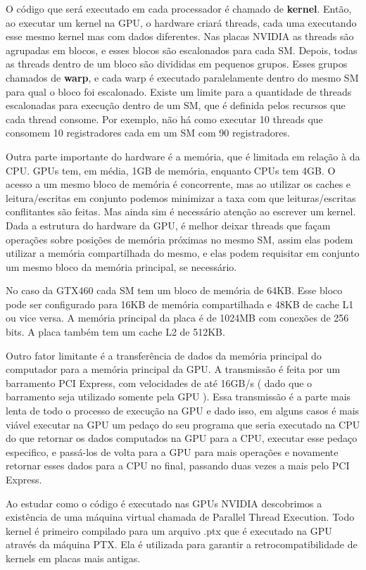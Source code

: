 O código que será executado em cada processador é chamado de \textbf{kernel}. Então, ao executar um kernel na GPU, o 
hardware criará threads, cada uma executando esse mesmo kernel mas com dados diferentes. Nas placas NVIDIA as threads 
são agrupadas em blocos, e esses blocos são escalonados para cada SM. Depois, todas as threads dentro de um bloco são 
divididas em pequenos grupos. Esses grupos chamados de \textbf{warp}\cite{paulo}, e cada warp é executado paralelamente dentro do 
mesmo SM para qual o bloco foi escalonado. Existe um limite para a quantidade de threads escalonadas para execução
dentro de um SM, que é definida pelos recursos que cada thread consome. Por exemplo, não há como executar 10 threads
que consomem 10 registradores cada em um SM com 90 registradores.

Outra parte importante do hardware é a memória, que é limitada em relação à da CPU. GPUs tem, em média, 1GB
de memória, enquanto CPUs tem 4GB. O acesso a um mesmo bloco de memória é concorrente, mas ao utilizar os caches e leitura/escritas em
conjunto podemos minimizar a taxa com que leituras/escritas conflitantes são feitas. Mas ainda sim é necessário atenção ao escrever um
kernel. Dada a estrutura do hardware da GPU, é melhor deixar threads que façam operações sobre posições de memória próximas no mesmo
SM, assim elas podem utilizar a memória compartilhada do mesmo, e elas podem requisitar em conjunto um mesmo bloco da memória principal,
se necessário.

No caso da GTX460 cada SM tem um bloco de memória de 64KB. Esse bloco pode ser configurado para 16KB de memória compartilhada e 48KB
de cache L1 ou vice versa. A memória principal da placa é de 1024MB com conexões de 256 bits. A placa também tem um
cache L2 de 512KB.

Outro fator limitante é a transferência de dados da memória principal do computador para a memória 
principal da GPU. A transmissão é feita por um barramento PCI Express, com velocidades de até 16GB/s ( dado que o
barramento seja utilizado somente pela GPU ). Essa transmissão é a parte mais lenta de todo o
processo de execução na GPU e dado isso, em alguns casos é mais viável executar na GPU um pedaço do seu programa que seria executado
na CPU do que retornar os dados computados na GPU para a CPU, executar esse pedaço especifico, e passá-los de volta para a GPU 
para mais operações e novamente retornar esses dados para a CPU no final, passando duas vezes a mais pelo PCI Express. 

Ao estudar como o código é executado nas GPUs NVIDIA descobrimos a existência de uma máquina virtual chamada de Parallel Thread Execution\cite{ptx}.
Todo kernel é primeiro compilado para um arquivo .ptx que é executado na GPU através da máquina PTX. Ela é utilizada para garantir 
a retrocompatibilidade de kernels em placas mais antigas.

